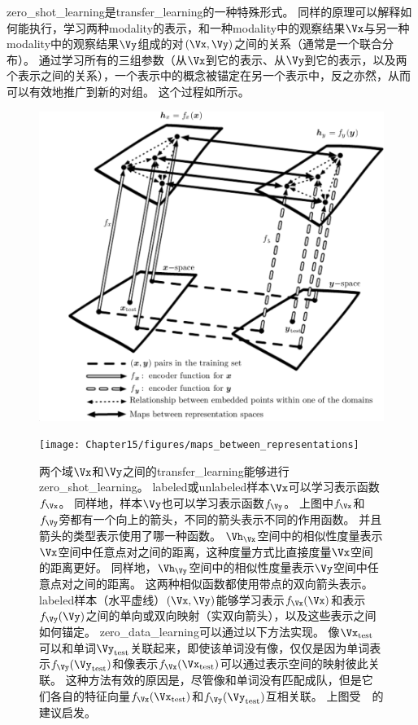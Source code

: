 
\gls{zero_shot_learning}是\gls{transfer_learning}的一种特殊形式。
同样的原理可以解释如何能执行，学习两种\gls{modality}的表示，和一种\gls{modality}中的观察结果$\Vx$与另一种\gls{modality}中的观察结果$\Vy$组成的对$(\Vx, \Vy)$之间的关系（通常是一个联合分布）\citep{Srivastava+Salakhutdinov-NIPS2012-small}。
通过学习所有的三组参数（从$\Vx$到它的表示、从$\Vy$到它的表示，以及两个表示之间的关系），一个表示中的概念被锚定在另一个表示中，反之亦然，从而可以有效地推广到新的对组。 %
这个过程如所示。



\begin{figure}[!htb]
\ifOpenSource
\centerline{\includegraphics[scale=0.5]{images/130.png}}
\else
\centerline{\texttt{[image: Chapter15/figures/maps\_between\_representations]}}
\fi
\caption{两个域$\Vx$和$\Vy$之间的\gls{transfer_learning}能够进行\gls{zero_shot_learning}。
\gls{labeled}或\gls{unlabeled}样本$\Vx$可以学习表示函数$f_{\Vx}$。
同样地，样本$\Vy$也可以学习表示函数$f_{\Vy}$。
上图中$f_{\Vx}$和$f_{\Vy}$旁都有一个向上的箭头，不同的箭头表示不同的作用函数。
并且箭头的类型表示使用了哪一种函数。
$\Vh_{\Vx}$空间中的相似性度量表示$\Vx$空间中任意点对之间的距离，这种度量方式比直接度量$\Vx$空间的距离更好。
同样地，$\Vh_{\Vy}$空间中的相似性度量表示$\Vy$空间中任意点对之间的距离。
这两种相似函数都使用带点的双向箭头表示。
\gls{labeled}样本（水平虚线）$(\Vx, \Vy)$能够学习表示$f_{\Vx}(\Vx)$和表示$f_{\Vy}(\Vy)$之间的单向或双向映射（实双向箭头），以及这些表示之间如何锚定。
\gls{zero_data_learning}可以通过以下方法实现。
像$\Vx_{\text{test}}$可以和单词$\Vy_{\text{test}}$关联起来，即使该单词没有像，仅仅是因为单词表示$f_{\Vy}(\Vy_{\text{test}})$和像表示$f_{\Vx}(\Vx_{\text{test}})$可以通过表示空间的映射彼此关联。
这种方法有效的原因是，尽管像和单词没有匹配成队，但是它们各自的特征向量$f_{\Vx}(\Vx_{\text{test}})$和$f_{\Vy}(\Vy_{\text{test}})$互相关联。
上图受~~的建议启发。
}
\label{fig:chap15_maps_between_representations}
\end{figure}

